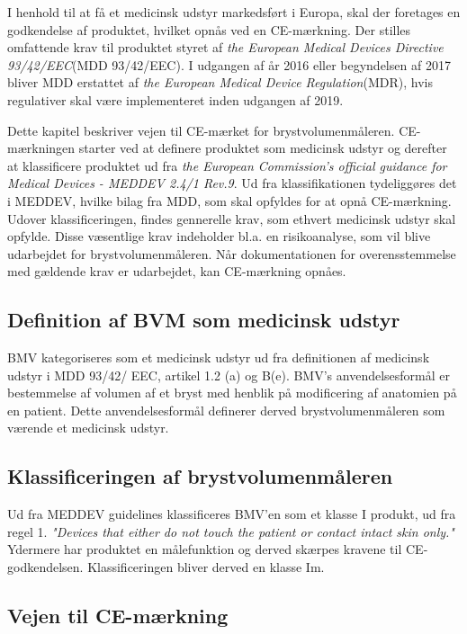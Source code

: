 I henhold til at få et medicinsk udstyr markedsført i Europa, skal der foretages en godkendelse af produktet, hvilket opnås ved en CE-mærkning. Der stilles omfattende krav til produktet styret af \textit{the European Medical Devices Directive 93/42/EEC}{}(MDD 93/42/EEC). I udgangen af år 2016 eller begyndelsen af 2017 bliver MDD erstattet af \textit{the European Medical Device Regulation}{}(MDR), hvis regulativer skal være implementeret inden udgangen af 2019. 
  
Dette kapitel beskriver vejen til CE-mærket for brystvolumenmåleren. CE-mærkningen starter ved at definere produktet som medicinsk udstyr og derefter at klassificere produktet ud fra \textit{the European Commission's official guidance for Medical Devices - MEDDEV 2.4/1 Rev.9}. Ud fra klassifikationen tydeliggøres det i MEDDEV, hvilke bilag fra MDD, som skal opfyldes for at opnå CE-mærkning. 
Udover klassificeringen, findes gennerelle krav, som ethvert medicinsk udstyr skal opfylde. Disse væsentlige krav indeholder bl.a. en risikoanalyse, som vil blive udarbejdet for brystvolumenmåleren. 
Når dokumentationen for overensstemmelse med gældende krav er udarbejdet, kan CE-mærkning opnåes.


\subsection{Definition af BVM som medicinsk udstyr}

BMV kategoriseres som et medicinsk udstyr ud fra definitionen af medicinsk udstyr i MDD 93/42/ EEC, artikel 1.2 (a) og B(e). BMV's anvendelsesformål er bestemmelse af volumen af et bryst med henblik på modificering af anatomien på en patient. Dette anvendelsesformål definerer derved brystvolumenmåleren som værende et medicinsk udstyr. 

\subsection{Klassificeringen af brystvolumenmåleren}

Ud fra MEDDEV guidelines klassificeres BMV'en som et klasse I produkt, ud fra regel 1.  
\textit{"Devices that either do not touch the patient or contact intact skin only."} 
Ydermere har produktet en målefunktion og derved skærpes kravene til CE-godkendelsen. Klassificeringen bliver derved en klasse Im.

\subsection{Vejen til CE-mærkning}

